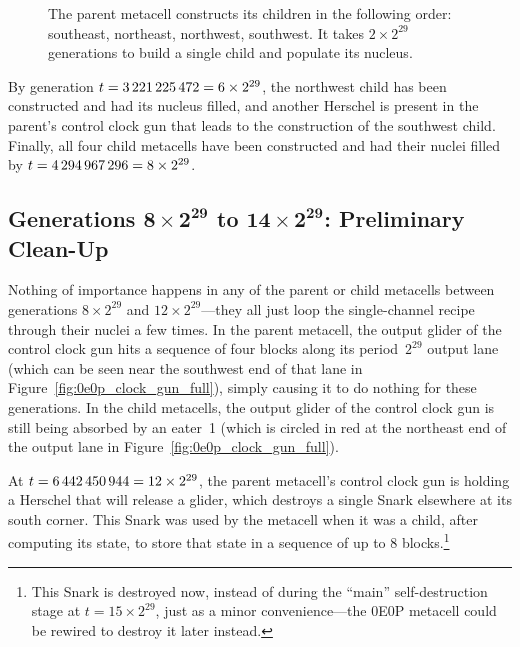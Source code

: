 \begin{figure}[!htb]
	\centering
	\caption{The parent metacell constructs its children in the following order: southeast, northeast, northwest, southwest. It takes $2 \times 2^{29}$ generations to build a single child and populate its nucleus.}
	\label{fig:0e0p_timeline_2147483648}
\end{figure}

By generation $t = 3{\,}221{\,}225{\,}472 = 6 \times 2^{29}$, the northwest child has been constructed and had its nucleus filled, and another Herschel is present in the parent's control clock gun  that leads to the construction of the southwest child. Finally, all four child metacells have been constructed and had their nuclei filled by $t = 4{\,}294{\,}967{\,}296 = 8 \times 2^{29}$.


\subsection{Generations $\mathbf{8 \times 2^{29}}$ to $\mathbf{14 \times 2^{29}}$: Preliminary Clean-Up}\label{sec:0e0p_timeline_prelim_cleanup}

Nothing of importance happens in any of the parent or child metacells between generations $8 \times 2^{29}$ and $12 \times 2^{29}$---they all just loop the single-channel recipe through their nuclei a few times. In the parent metacell, the output glider of the control clock gun hits a sequence of four blocks along its period~$2^{29}$ output lane (which can be seen near the southwest end of that lane in Figure~\ref{fig:0e0p_clock_gun_full}), simply causing it to do nothing for these generations. In the child metacells, the output glider of the control clock gun is still being absorbed by an eater~1 (which is circled in red at the northeast end of the output lane in Figure~\ref{fig:0e0p_clock_gun_full}).

At $t = 6{\,}442{\,}450{\,}944 = 12 \times 2^{29}$, the parent metacell's control clock gun is holding a Herschel that will release a glider, which destroys a single Snark elsewhere at its south corner. This Snark was used by the metacell when it was a child, after computing its state, to store that state in a sequence of up to 8 blocks.\footnote{This Snark is destroyed now, instead of during the ``main'' self-destruction stage at $t = 15 \times 2^{29}$, just as a minor convenience---the 0E0P metacell could be rewired to destroy it later instead.}

